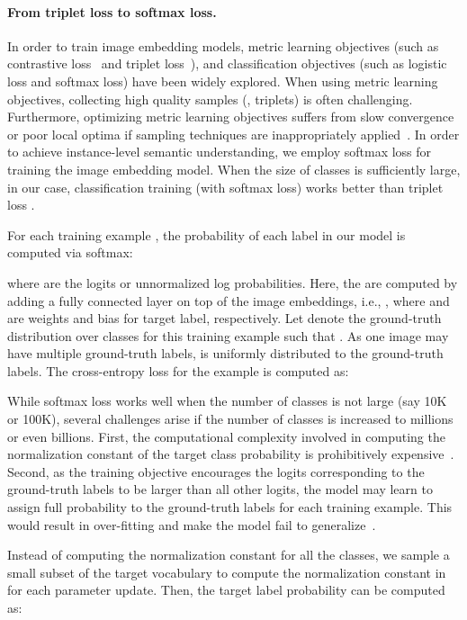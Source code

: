 \documentclass[sigconf]{acmart}
\begin{document}
\paragraph{From triplet loss to softmax loss.} In order to train image embedding models, metric learning objectives (such as contrastive loss~\cite{hadsell2006dimensionality,sun2014deep} and triplet loss~\cite{wang2014learning}), and classification objectives (such as logistic loss and softmax loss) have been widely explored. When using metric learning objectives, collecting high quality samples (\eg, triplets) is often challenging. Furthermore, optimizing metric learning objectives suffers from slow convergence or poor local optima if sampling techniques are inappropriately applied~\cite{wu2017sampling,sohn2016improved}. In order to achieve instance-level semantic understanding, we employ softmax loss for training the image embedding model. When the size of classes is sufficiently large,  in our case, classification training (with softmax loss) works better than triplet loss \cite{wang2014learning}.  

For each training example , the probability of each label  in our model is computed via softmax: 

where  are the logits or unnormalized log probabilities. Here, the  are computed by adding a fully connected layer on top of the image embeddings, i.e., , where  and  are weights and bias for target label, respectively. Let  denote the ground-truth distribution over classes for this training example such that . As one image may have multiple ground-truth labels,  is uniformly distributed to the ground-truth labels. 
The cross-entropy loss for the example is computed as: 


While softmax loss works well when the number of classes is not large (say 10K or 100K), several challenges arise if the number of classes is increased to millions or even billions. First, the computational complexity involved in computing the normalization constant of the target class probability  is prohibitively expensive~\cite{bengio2008adaptive,jean2014using}. Second, as the training objective encourages the logits corresponding to the ground-truth labels to be larger than all other logits, the model may learn to assign full probability to the ground-truth labels for each training example. This would result in over-fitting and make the model fail to generalize~\cite{szegedy2016rethinking}. 

Instead of computing the normalization constant for all the classes, we sample a small subset of the target vocabulary  to compute the normalization constant in  for each parameter update. Then, the target label probability can be computed as:
\end{document}
